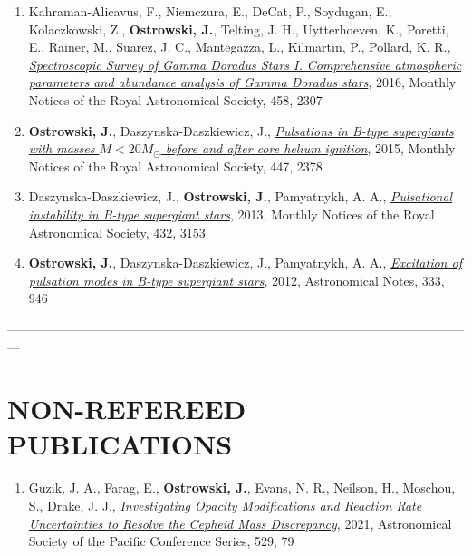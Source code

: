 \documentclass[margin, 10pt]{res} %
\begin{document}
\begin{resume}
\begin{enumerate}
    \item Kahraman-Alicavus, F., Niemczura, E., DeCat, P., Soydugan, E., Kolaczkowski, Z., \textbf{Ostrowski, J.}, Telting, J. H., Uytterhoeven, K., Poretti, E., Rainer, M., Suarez, J. C., Mantegazza, L., Kilmartin, P., Pollard, K. R., \href{http://adsabs.harvard.edu/abs/2016MNRAS.458.2307K}{\textit{Spectroscopic Survey of Gamma Doradus Stars I. Comprehensive atmospheric parameters and abundance analysis of Gamma Doradus stars}},  2016, Monthly Notices of the Royal Astronomical Society, 458, 2307

    \item \textbf{Ostrowski, J.}, Daszynska-Daszkiewicz, J., \href{http://adsabs.harvard.edu/abs/2015MNRAS.447.2378O}{\textit{Pulsations in B-type supergiants with masses $M < 20 M_\odot$ before and after core helium ignition}}, 2015, Monthly Notices of the Royal Astronomical Society, 447, 2378

    \item Daszynska-Daszkiewicz, J.,\textbf{ Ostrowski, J.}, Pamyatnykh, A. A., \href{http://adsabs.harvard.edu/abs/2013MNRAS.432.3153D}{\textit{Pulsational instability in B-type supergiant stars}}, 2013, Monthly Notices of the Royal Astronomical Society, 432, 3153

    \item \textbf{Ostrowski, J.}, Daszynska-Daszkiewicz, J., Pamyatnykh, A. A., \href{http://adsabs.harvard.edu/abs/2012AN....333..946O}{\textit{Excitation of pulsation modes in B-type supergiant stars}}, 2012, Astronomical Notes, 333, 946
\end{enumerate}

---------------------------------------------------------------------------------------------------------------

\section{NON-REFEREED \\ PUBLICATIONS} 

\begin{enumerate}

    \item Guzik, J. A., Farag, E., \textbf{Ostrowski, J.}, Evans, N. R., Neilson, H., Moschou, S., Drake, J. J., \href{https://ui.adsabs.harvard.edu/abs/2021ASPC..529...79G/abstract}{\textit{Investigating Opacity Modifications and Reaction Rate Uncertainties to Resolve the Cepheid Mass Discrepancy}}, 2021, Astronomical Society of the Pacific Conference Series, 529, 79


\end{enumerate}
\end{resume}
\end{document}
